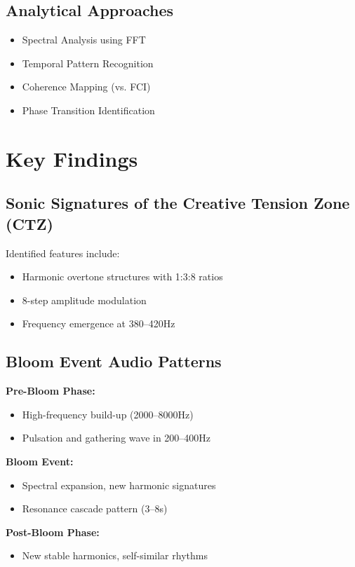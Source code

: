 \documentclass[12pt]{article}
\begin{document}
\subsection{Analytical Approaches}
\begin{itemize}
  \item Spectral Analysis using FFT
  \item Temporal Pattern Recognition
  \item Coherence Mapping (vs. FCI)
  \item Phase Transition Identification
\end{itemize}

\section{Key Findings}

\subsection{Sonic Signatures of the Creative Tension Zone (CTZ)}
Identified features include:
\begin{itemize}
  \item Harmonic overtone structures with 1:3:8 ratios
  \item 8-step amplitude modulation
  \item Frequency emergence at 380--420Hz
\end{itemize}

\subsection{Bloom Event Audio Patterns}
\textbf{Pre-Bloom Phase:}
\begin{itemize}
  \item High-frequency build-up (2000--8000Hz)
  \item Pulsation and gathering wave in 200--400Hz
\end{itemize}
\textbf{Bloom Event:}
\begin{itemize}
  \item Spectral expansion, new harmonic signatures
  \item Resonance cascade pattern (3--8s)
\end{itemize}
\textbf{Post-Bloom Phase:}
\begin{itemize}
  \item New stable harmonics, self-similar rhythms
\end{itemize}
\end{document}
